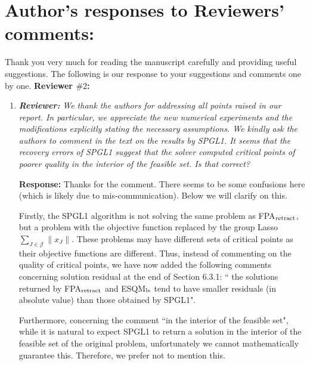 \documentclass{article}
\begin{document}
\section*{Author's responses to Reviewers' comments:}
Thank you very much for reading the manuscript carefully and providing useful suggestions. The following is our response to your suggestions and comments one by one.
\textbf{Reviewer $\# 2$:}
\begin{enumerate}
        \item \textit{\textbf{Reviewer:}} \textit{ We thank the authors for addressing all points raised in our report. In particular, we appreciate the new numerical experiments and the modifications explicitly stating the necessary assumptions. We kindly ask the authors to comment in the text on the results by SPGL1. It seems that the recovery errors of SPGL1 suggest that the solver computed critical points of poorer quality in the interior of the feasible set. Is that correct?}
        
        \textbf{Response:} Thanks for the comment. There seems to be some confusions here (which is likely due to mis-communication). Below we will clarify on this.  
        
Firstly, the SPGL1 algorithm is not solving the same problem as FPA$_{\rm retract}$, but a problem with the objective function replaced by the group Lasso $\sum\limits_{J\in\mathcal{J}}\|x_J\|$. These problems may have different sets of critical points as their objective functions are different. Thus, instead of commenting on the quality of critical points, we have now added the following comments concerning solution residual at the end of Section 6.3.1: `` the solutions returned by FPA$_{\rm retract}$ and
{\rm ESQM}$_{\rm ls}$ tend to have smaller residuals (in absolute value) than those obtained by SPGL1". 

Furthermore, concerning the comment ``in the interior of the feasible set", while
it is natural to expect SPGL1 to return a solution in the interior of the feasible set of the original problem, unfortunately we cannot mathematically guarantee this. %
Therefore, we prefer
not to mention this. 
        

\end{enumerate}
\end{document}
